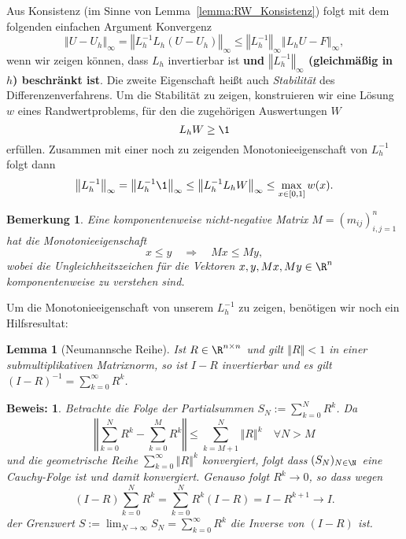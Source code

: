\documentclass[
]{mycourse}
\theoremstyle{mythm}
\newtheorem{bemerkung}[theorem]{Bemerkung}
\newtheorem{lemma}[theorem]{Lemma}
\theoremstyle{break}
\newtheorem*{beweis}{Beweis:}
\newcommand{\norm}[1]{\left\Vert#1\right\Vert}		%
\begin{document}
Aus Konsistenz (im Sinne von Lemma~\ref{lemma:RW_Konsistenz}) folgt mit 
dem folgenden einfachen Argument Konvergenz
\[
\norm{U-U_h}_\infty = \norm{L_h^{-1} L_h (U-U_h)}_\infty\leq \norm{L_h^{-1}}_\infty \norm{L_h U-F}_\infty,
\]
wenn wir zeigen können, dass $L_h$ invertierbar ist {\bf und $\norm{L_h^{-1}}_\infty$ (gleichmäßig in $h$) beschränkt ist}. Die zweite Eigenschaft heißt auch \emph{Stabilität} des Differenzenverfahrens. Um die Stabilität zu zeigen, 
konstruieren wir eine Lösung $w$ eines Randwertproblems, für den die zugehörigen Auswertungen $W$ 
\[
L_h W\geq \1
\]
erfüllen. Zusammen mit einer noch zu zeigenden Monotonieeigenschaft von $L_h^{-1}$ folgt
dann
\[
\norm{L_h^{-1}}_\infty = \norm{L_h^{-1} \1}_\infty \leq \norm{L_h^{-1} L_h W}_\infty\leq \max_{x\in [0,1]} w(x).
\]



\begin{bemerkung}\label{bem:monotonie}
Eine komponentenweise nicht-negative Matrix $M=(m_{ij})_{i,j=1}^n$ hat die Monotonieeigenschaft
\[
x\leq y \quad \Longrightarrow \quad Mx\leq My, 
\]
wobei die Ungleichheitszeichen für die Vektoren $x,y,Mx,My\in \R^n$ komponentenweise zu verstehen sind.
\end{bemerkung}


Um die Monotonieeigenschaft von unserem $L_h^{-1}$ zu zeigen, benötigen 
wir noch ein Hilfsresultat:

\begin{lemma}[Neumannsche Reihe]\label{lemma:NR}
Ist $R\in \R^{n\times n}$ und gilt $\norm{R}<1$ in einer submultiplikativen Matrixnorm,
so ist $I-R$ invertierbar und es gilt $(I-R)^{-1}=\sum_{k=0}^\infty R^k$.
\end{lemma}
\begin{beweis}
Betrachte die Folge der Partialsummen $S_N:=\sum_{k=0}^N R^k$. Da
\[
\norm{\sum_{k=0}^N R^k - \sum_{k=0}^M R^k}\leq \sum_{k=M+1}^N \norm{R}^k \quad \forall N>M
\]
und die geometrische Reihe $\sum_{k=0}^\infty \norm{R}^k$ konvergiert, folgt dass
$(S_N)_{N\in \N}$ eine Cauchy-Folge ist und damit konvergiert. 
Genauso folgt $R^k\to 0$, so dass wegen
\[
(I-R) \sum_{k=0}^N R^k= \sum_{k=0}^N R^k (I-R) = I- R^{k+1}\to I.
\]
der Grenzwert $S:=\lim_{N\to \infty}S_N=\sum_{k=0}^\infty R^k$  die Inverse von $(I-R)$ ist.
\end{beweis}
\end{document}

